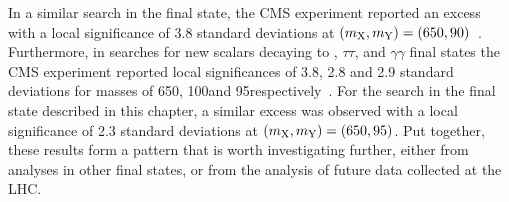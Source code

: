 

In a similar \XYH search in the \bbgg final state, the CMS experiment reported an excess with a local significance of 3.8 standard deviations at $(m_{\mathrm{X}}, m_{\mathrm{Y}}) = (650, 90)$\GeV~\cite{CMS:2023boe}. Furthermore, in searches for new scalars decaying to \WW, $\tau\tau$, and $\gamma\gamma$ final states the CMS experiment reported local significances of 3.8, 2.8 and 2.9 standard deviations for masses of 650\GeV, 100\GeV and 95\GeV respectively~\cite{CMS:2022bcb,CMS:2022goy,CMS:2024yhz}. For the search in the \ggtt final state described in this chapter, a similar excess was observed with a local significance of 2.3 standard deviations at $(m_{\mathrm{X}}, m_{\mathrm{Y}}) = (650, 95)$\GeV. Put together, these results form a pattern that is worth investigating further, either from analyses in other final states, or from the analysis of future data collected at the LHC.

